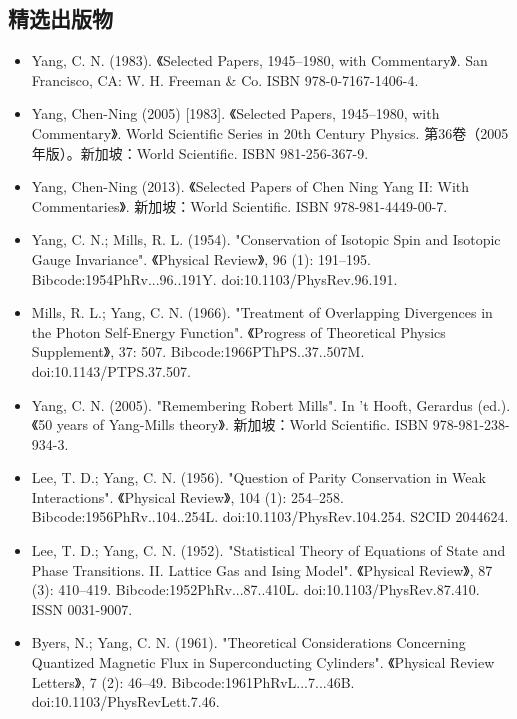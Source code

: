\subsection{精选出版物}
\begin{itemize}
\item Yang, C. N. (1983). 《Selected Papers, 1945–1980, with Commentary》. San Francisco, CA: W. H. Freeman & Co. ISBN 978-0-7167-1406-4.
\item Yang, Chen-Ning (2005) [1983]. 《Selected Papers, 1945–1980, with Commentary》. World Scientific Series in 20th Century Physics. 第36卷（2005年版）。新加坡：World Scientific. ISBN 981-256-367-9.
\item Yang, Chen-Ning (2013). 《Selected Papers of Chen Ning Yang II: With Commentaries》. 新加坡：World Scientific. ISBN 978-981-4449-00-7.
\item Yang, C. N.; Mills, R. L. (1954). "Conservation of Isotopic Spin and Isotopic Gauge Invariance". 《Physical Review》, 96 (1): 191–195. Bibcode:1954PhRv...96..191Y. doi:10.1103/PhysRev.96.191.
\item Mills, R. L.; Yang, C. N. (1966). "Treatment of Overlapping Divergences in the Photon Self-Energy Function". 《Progress of Theoretical Physics Supplement》, 37: 507. Bibcode:1966PThPS..37..507M. doi:10.1143/PTPS.37.507.
\item Yang, C. N. (2005). "Remembering Robert Mills". In 't Hooft, Gerardus (ed.). 《50 years of Yang-Mills theory》. 新加坡：World Scientific. ISBN 978-981-238-934-3.
\item Lee, T. D.; Yang, C. N. (1956). "Question of Parity Conservation in Weak Interactions". 《Physical Review》, 104 (1): 254–258. Bibcode:1956PhRv..104..254L. doi:10.1103/PhysRev.104.254. S2CID 2044624.
\item Lee, T. D.; Yang, C. N. (1952). "Statistical Theory of Equations of State and Phase Transitions. II. Lattice Gas and Ising Model". 《Physical Review》, 87 (3): 410–419. Bibcode:1952PhRv...87..410L. doi:10.1103/PhysRev.87.410. ISSN 0031-9007.
\item Byers, N.; Yang, C. N. (1961). "Theoretical Considerations Concerning Quantized Magnetic Flux in Superconducting Cylinders". 《Physical Review Letters》, 7 (2): 46–49. Bibcode:1961PhRvL...7...46B. doi:10.1103/PhysRevLett.7.46.
\end{itemize}
